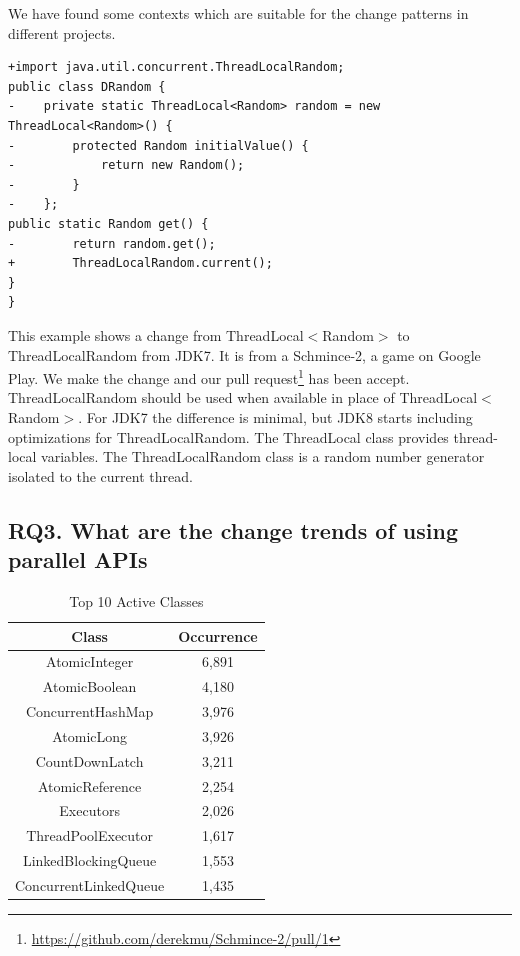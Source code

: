 

 We have found some contexts which are suitable for the change patterns in different projects.

\begin{lstlisting}
+import java.util.concurrent.ThreadLocalRandom;
public class DRandom {
-    private static ThreadLocal<Random> random = new ThreadLocal<Random>() {
-        protected Random initialValue() {
-            return new Random();
-        }
-    };
public static Random get() {
-        return random.get();
+        ThreadLocalRandom.current();
}
}
\end{lstlisting}

This example shows a change from ThreadLocal$<$Random$>$ to ThreadLocalRandom from JDK7. It is from a Schmince-2, a game on Google Play. We make the change and our pull request\footnote{\url{https://github.com/derekmu/Schmince-2/pull/1}} has been accept. ThreadLocalRandom should be used when available in place of ThreadLocal$<$Random$>$. For JDK7 the difference is minimal, but JDK8 starts including optimizations for ThreadLocalRandom. The ThreadLocal class provides thread-local variables. The ThreadLocalRandom class is a random number generator isolated to the current thread.

\subsection{RQ3. What are the change trends of using parallel APIs}
\label{sec:result:trend}
\begin{table}
	\centering
	\caption{Top 10 Active Classes}
\label{table:topapi}
	\begin{tabular}{|c|c|}\hline
		Class&Occurrence\\\hline
		AtomicInteger&6,891\\
		AtomicBoolean&4,180\\
		ConcurrentHashMap&3,976\\
		AtomicLong&3,926\\
		CountDownLatch&3,211\\
		AtomicReference&2,254\\
		Executors&2,026\\
		ThreadPoolExecutor&1,617\\
		LinkedBlockingQueue&1,553\\
		ConcurrentLinkedQueue&1,435\\\hline
	\end{tabular}
\end{table}


